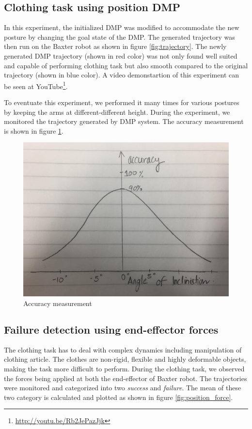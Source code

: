 \documentclass[sigconf]{acmart}
\begin{document}
\subsection{Clothing task using position DMP}
In this experiment, the initialized DMP was modified to accommodate the new posture by changing the goal state of the DMP. The generated trajectory was then run on the Baxter robot as shown in figure \ref{fig:trajectory}. The newly generated DMP trajectory (shown in red color) was not only found well suited and capable of performing clothing task but also smooth compared to the original trajectory (shown in blue color). A video demonstartion of this experiment can be seen at YouTube\footnote{\url{http://youtu.be/Rb2JePazJjk}}.

To eventuate this experiment, we performed it many times for various postures by keeping the arms at different-different height. During the experiment, we monitored the trajectory generated by DMP system. The accuracy measurement is shown in figure \ref{fig:accuracy}.

\begin{figure}
	\includegraphics[width=\linewidth]{accuracy}
	\caption{Accuracy measurement}
	\label{fig:accuracy}
\end{figure}

\subsection{Failure detection using end-effector forces}
The clothing task has to deal with complex dynamics including manipulation of clothing article. The clothes are non-rigid, flexible and highly deformable objects, making the task more difficult to perform. During the clothing task, we observed the forces being applied at both the end-effector of Baxter robot. The trajectories were monitored and categorized into two \textit{success} and \textit{failure}. The mean of these two category is calculated and plotted as shown in figure \ref{fig:position_force}.
\end{document}
